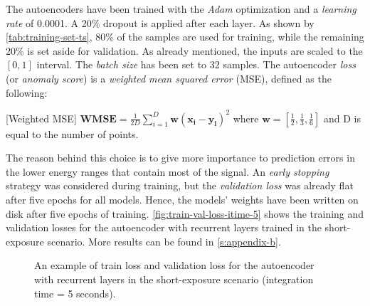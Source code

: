 The autoencoders have been trained with the \textit{Adam} optimization \cite{Kingma_2014} and a \textit{learning rate} of 0.0001. A 20\% dropout is applied after each layer. As shown by \autoref{tab:training-set-ts}, 80\% of the samples are used for training, while the remaining 20\% is set aside for validation. As already mentioned, the inputs are scaled to the $[0, 1]$ interval. The \textit{batch size} has been set to 32 samples. The autoencoder \textit{loss} (or \textit{anomaly score}) is a \textit{weighted mean squared error} (MSE), defined as the following:
\begin{definition} \label{def:wmse}
[Weighted MSE] $\textbf{WMSE}=\frac{1}{2D}\sum_{i=1}^{D}\bm{w}(\bm{x_i}-\bm{y_i})^2$ where $\bm{w}=[\frac{1}{2}, \frac{1}{3}, \frac{1}{6}]$ and D is equal to the number of points. 
\end{definition}
The reason behind this choice is to give more importance to prediction errors in the lower energy ranges that contain most of the signal. An \textit{early stopping} strategy was considered during training, but the \textit{validation loss} was already flat after five epochs for all models. Hence, the models' weights have been written on disk after five epochs of training. \autoref{fig:train-val-loss-itime-5} shows the training and validation losses for the autoencoder with recurrent layers trained in the short-exposure scenario. More results can be found in \autoref{s:appendix-b}.
\begin{figure}[t]
    \centering
    \begin{minipage}{1\textwidth}
       \centering
        
    \end{minipage}
    \caption{An example of train loss and validation loss for the autoencoder with recurrent layers in the short-exposure scenario (integration time = 5 seconds).}
    \label{fig:train-val-loss-itime-5}
\end{figure}
 


